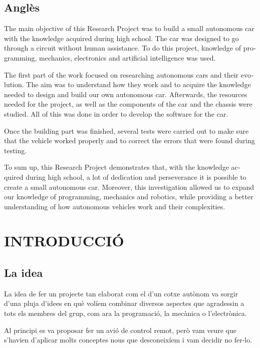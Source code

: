 \documentclass[11pt,a4paper]{article}
\let\origsection\section
\renewcommand{\section}{\clearpage\origsection}
\begin{document}
\subsection*{Anglès}
\begin{otherlanguage}{english}

The main objective of this Research Project was to build a small autonomous car with the knowledge acquired during high school. The car was designed to go through a circuit without human assistance. To do this project, knowledge of programming, mechanics, electronics and artificial intelligence was used.

The first part of the work focused on researching autonomous cars and their evolution. The aim was to understand how they work and to acquire the knowledge needed to design and build our own autonomous car. Afterwards, the resources needed for the project, as well as the components of the car and the chassis were studied. All of this was done in order to develop the software for the car.

Once the building part was finished, several tests were carried out to make sure that the vehicle worked properly and to correct the errors that were found during testing.

To sum up, this Research Project demonstrates that, with the knowledge acquired during high school, a lot of dedication and perseverance it is possible to create a small autonomous car. Moreover, this investigation allowed us to expand our knowledge of programming, mechanics and robotics, while providing a better understanding of how autonomous vehicles work and their complexities.

\end{otherlanguage}

\section{INTRODUCCIÓ}

\subsection{La idea}

La idea de fer un projecte tan elaborat com el d’un cotxe autònom va sorgir d’una pluja d’idees en què volíem combinar diversos aspectes que agradessin a tots els membres del grup, com ara la programació, la mecànica o l’electrònica.

Al principi es va proposar fer un avió de control remot, però vam veure que s’havien d’aplicar molts conceptes nous que desconeixíem i vam decidir no fer-lo.
\end{document}
